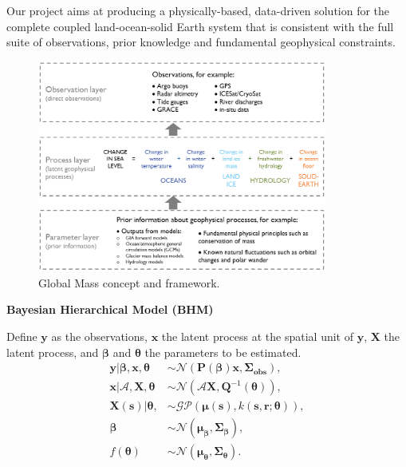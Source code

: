 \documentclass[portrait,a1paper,fontscale=0.46, margin = 5em, final]{baposter}
\begin{document}
\begin{poster}
{\begin{minipage}{0.25\textwidth}
\vspace{1.5em}
Our project aims at producing a physically-based, data-driven solution for the complete coupled land-ocean-solid Earth system that is consistent with the full suite of observations, prior knowledge and fundamental geophysical constraints.
  \end{minipage}
 \begin{minipage}{0.4\textwidth}
 \begin{figure}[H]
\centering
\includegraphics[width = 0.85\textwidth]{GMconcept-simplified}
\caption{Global Mass concept and framework.}
\end{figure}
 \end{minipage}
\begin{minipage}{0.34\textwidth}
\begin{center}
\textbf{Bayesian Hierarchical Model (BHM) }\cite{AZM2015}
\end{center}
Define $\bm{y}$ as the observations, $\bm{x}$ the latent process at the spatial unit of $\bm{y}$, $\bm{X}$ the latent process, and $\bm{\beta}$ and $\bm{\theta}$ the parameters to be estimated. 
\begin{align*}
\bm{y} | \bm{\beta}, \bm{x}, \bm{\theta} &\sim \mathcal{N}(\bm{P}(\bm{\beta}) \bm{x}, \bm{\Sigma_{obs}}), \\
\bm{x} | \mathcal{A}, \bm{X}, \bm{\theta} &\sim \mathcal{N}(\mathcal{A}\bm{X}, \bm{Q}^{-1}(\bm{\theta})),\\
\bm{X(\bm{s})} | \bm{\theta}, &\sim \mathcal{GP} (\bm{\mu}(\bm{s}), k(\bm{s}, \bm{r}; \bm{\theta})), \\
\bm{\beta} &\sim \mathcal{N}(\bm{\mu}_{\bm{\beta}}, \bm{\Sigma}_{\bm{\beta}}),\\
f(\bm{\theta}) &\sim \mathcal{N}(\bm{\mu}_{\bm{\theta}}, \bm{\Sigma}_{\bm{\theta}}).

\end{align*}
\end{minipage}}
\end{poster}
\end{document}
